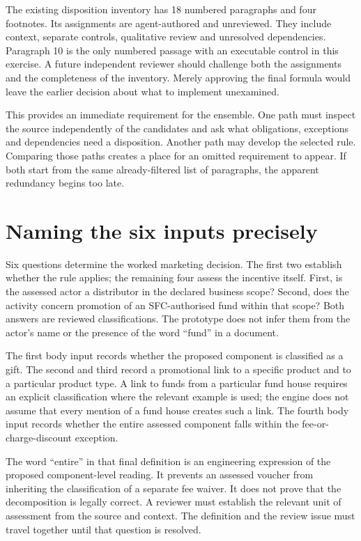The existing disposition inventory has 18 numbered paragraphs and four
footnotes. Its assignments are agent-authored and unreviewed. They include
context, separate controls, qualitative review and unresolved dependencies.
Paragraph 10 is the only numbered passage with an executable control in this
exercise. A future independent reviewer should challenge both the assignments
and the completeness of the inventory. Merely approving the final formula would
leave the earlier decision about what to implement unexamined.

This provides an immediate requirement for the ensemble. One path must inspect
the source independently of the candidates and ask what obligations, exceptions
and dependencies need a disposition. Another path may develop the selected
rule. Comparing those paths creates a place for an omitted requirement to
appear. If both start from the same already-filtered list of paragraphs, the
apparent redundancy begins too late.

\section{Naming the six inputs precisely}
\label{merge:M02:02}

\label{sec:circular-inputs}
Six questions determine the worked marketing decision. The first two establish
whether the rule applies; the remaining four assess the incentive itself. First,
is the assessed actor a distributor in the declared business scope? Second, does
the activity concern promotion of an SFC-authorised fund within that scope?
Both answers are reviewed classifications.
The prototype does not infer them from the actor's name or the presence of the
word ``fund'' in a document.

The first body input records whether the proposed component is classified as a
gift. The second and third record a promotional link to a specific product and
to a particular product type. A link to funds from a particular fund house
requires an explicit classification where the relevant example is used; the
engine does not assume that every mention of a fund house creates such a link.
The fourth body input records whether the entire assessed component falls
within the fee-or-charge-discount exception.

The word ``entire'' in that final definition is an engineering expression of
the proposed component-level reading. It prevents an assessed voucher from
inheriting the classification of a separate fee waiver. It does not prove that
the decomposition is legally correct. A reviewer must establish the relevant
unit of assessment from the source and context. The definition and the review
issue must travel together until that question is resolved.

